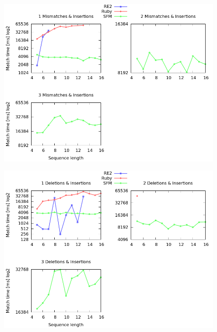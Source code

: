 \documentclass[12pt]{article}
\theoremstyle{definition}
\begin{document}
\begin{figure}[H]
	\begin{center}
		\includegraphics[scale=0.55]{graphs/mismatches_insertions.png}	
	\end{center}
	\caption{}
	\label{graph:cases:combinations}
\end{figure}

\begin{figure}[H]
	\begin{center}
		\includegraphics[scale=0.55]{graphs/deletions_insertions.png}	
	\end{center}
	\caption{}
	\label{graph:cases:combinations}
\end{figure}
\end{document}
